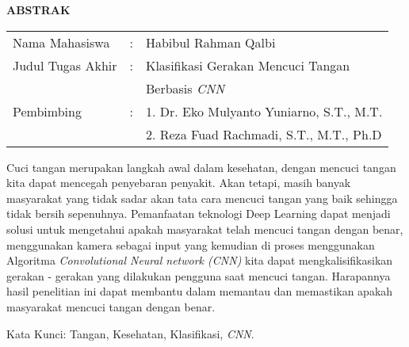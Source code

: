 \begin{center}
  \large\textbf{ABSTRAK}
\end{center}


\vspace{2ex}

\begingroup
  \setlength{\tabcolsep}{0pt}

  \noindent
  \begin{tabularx}{\textwidth}{l >{\centering}m{2em} X}
    Nama Mahasiswa    &:& 	Habibul Rahman Qalbi\\

    Judul Tugas Akhir &:&	Klasifikasi Gerakan Mencuci Tangan  \\
    				  & &	Berbasis \emph{CNN} \\

    Pembimbing        &:& 1. Dr. Eko Mulyanto Yuniarno, S.T., M.T. \\
                      & & 2. Reza Fuad Rachmadi, S.T., M.T., Ph.D \\
  \end{tabularx}
\endgroup

Cuci tangan merupakan langkah awal dalam kesehatan, dengan mencuci tangan kita dapat mencegah penyebaran penyakit. Akan tetapi, masih banyak masyarakat yang tidak sadar akan tata cara mencuci tangan yang baik sehingga tidak bersih sepenuhnya. Pemanfaatan teknologi Deep Learning dapat menjadi solusi untuk mengetahui apakah masyarakat telah mencuci tangan dengan benar, menggunakan kamera sebagai input yang kemudian di proses menggunakan Algoritma \emph{Convolutional Neural network (CNN)} kita dapat mengkalisiﬁkasikan gerakan - gerakan yang dilakukan pengguna saat mencuci tangan. Harapannya hasil penelitian ini dapat membantu dalam memantau dan memastikan apakah masyarakat mencuci tangan dengan benar.

Kata Kunci: Tangan, Kesehatan, Klasifikasi, \emph{CNN}.
